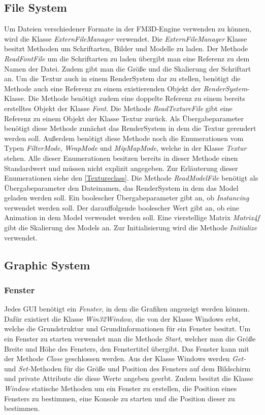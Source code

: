 \subsection{File System}
Um Dateien verschiedener Formate in der FM3D-Engine verwenden zu können, wird die Klasse \textit{ExternFileManager} verwendet.
Die \textit{ExternFileManager} Klasse besitzt Methoden um Schriftarten, Bilder und Modelle zu laden. Der Methode \textit{ReadFontFile} um die Schriftarten zu laden übergibt man eine Referenz zu dem Namen der Datei. Zudem gibt man die Größe und die Skalierung der Schriftart an. Um die Textur auch in einem RenderSystem dar zu stellen, benötigt die Methode auch eine Referenz zu einem existierenden Objekt der \textit{RenderSystem}-Klasse. Die Methode benötigt zudem eine doppelte Referenz zu einem bereits erstelltes Objekt der Klasse \textit{Font}. 
Die Methode \textit{ReadTextureFile} gibt eine Referenz zu einem Objekt der Klasse Textur zurück. Als Übergabeparameter benötigt diese Methode zunächst das RenderSystem in dem die Textur gerendert werden soll. Außerdem benötigt diese Methode noch  die Enumerationen vom Typen \textit{FilterMode}, \textit{WrapMode} und \textit{MipMapMode}, welche in der Klasse \textit{Textur} stehen. Alle dieser Enumerationen besitzen bereits in dieser Methode einen Standardwert und müssen nicht explizit angegeben. Zur Erläuterung dieser Enumerationen siehe den \cref{Textureclass}. 
Die Methode \textit{ReadModelFile} benötigt als Übergabeparameter den Dateinamen, das RenderSystem in dem das Model geladen werden soll. Ein boolescher Übergabeparameter gibt an, ob \textit{Instancing} verwendet werden soll. Der darauffolgende  boolescher Wert gibt an, ob eine Animation in dem Model verwendet werden soll. Eine vierstellige Matrix \textit{Matrix4f} gibt die Skalierung des Models an.
Zur Initialisierung wird die Methode \textit{Initialize} verwendet.

\subsection{Graphic System}

\subsubsection{Fenster}
Jedes GUI benötigt ein \textit{Fenster}, in dem die Grafiken angezeigt werden können. Dafür existiert die Klasse \textit{Win32Window}, die von der Klasse Windows erbt, welche die Grundstruktur und Grundinformationen für ein Fenster besitzt. 
Um ein Fenster zu starten verwendet man die Methode \textit{Start}, welcher man die Größe Breite und Höhe des Fensters, den Fenstertitel übergibt. Das Fenster kann mit der Methode \textit{Close} geschlossen werden.
Aus der Klasse Windows werden \textit{Get-} und \textit{Set-}Methoden für die Größe und Position des Fensters auf dem Bildschirm und private Attribute die diese Werte angeben geerbt.
Zudem besitzt die Klasse \textit{Window} statische Methoden um ein Fenster zu erstellen, die Position eines Fensters zu bestimmen, eine Konsole zu starten und die Position dieser zu bestimmen.

